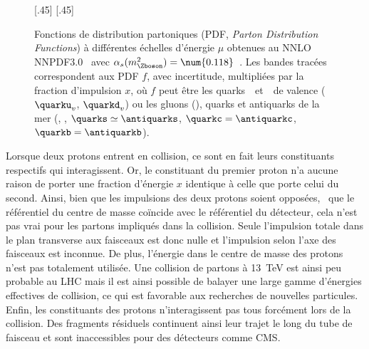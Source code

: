 \begin{figure}[t]
\centering
{}[.45\textwidth]
{}
\hfill
{}[.45\textwidth]
{}
\caption[Fonctions de distribution partoniques.]{Fonctions de distribution partoniques (PDF, \emph{Parton Distribution Functions}) à différentes échelles d'énergie $\mu$ obtenues au NNLO NNPDF3.0~\cite{NNPDF30} avec $\alpha_s(m_{\Zboson}^2)=\num{0.118}$~\cite{PDG_booklet_2020}. Les bandes tracées correspondent aux PDF $f$, avec incertitude, multipliées par la fraction d'impulsion $x$, où $f$ peut être les quarks~\quarku\ et~\quarkd\ de valence ($\quarku_v$, $\quarkd_v$) ou les gluons (\gluon), quarks et antiquarks de la mer (\antiquarku, \antiquarkd, $\quarks\simeq\antiquarks$, $\quarkc=\antiquarkc$, $\quarkb=\antiquarkb$).}
\label{fig-proton_PDFs}
\end{figure}
\par Lorsque deux protons entrent en collision, ce sont en fait leurs constituants respectifs qui interagissent.
Or, le constituant du premier proton n'a aucune raison de porter une fraction d'énergie $x$ identique à celle que porte celui du second.
Ainsi, bien que les impulsions des deux protons soient opposées, \ie\ que le référentiel du centre de masse
coïncide avec le référentiel du détecteur, cela n'est pas vrai pour les partons impliqués dans la collision.
Seule l'impulsion totale dans le plan transverse aux faisceaux est donc nulle et l'impulsion selon l'axe des faisceaux est inconnue.
De plus, l'énergie dans le centre de masse des protons n'est pas totalement utilisée.
Une collision de partons à \SI{13}{\TeV} est ainsi peu probable au LHC
mais
il est ainsi possible de balayer une large gamme d'énergies effectives de collision, ce qui est favorable aux recherches de nouvelles particules.
Enfin, les constituants des protons n'interagissent pas tous forcément lors de la collision.
Des fragments résiduels continuent ainsi leur trajet le long du tube de faisceau et sont inaccessibles pour des détecteurs comme CMS.

